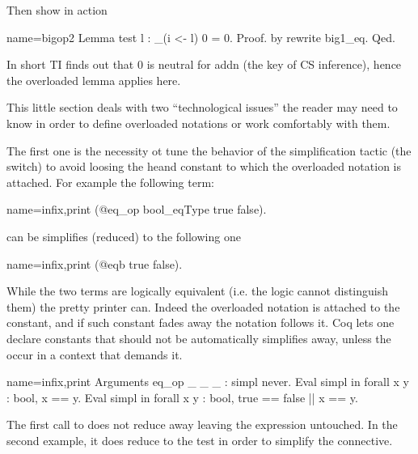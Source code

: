Then show in action

\begin{coq}{name=bigop2}{}
Lemma test l : \sum_(i <- l) 0 = 0.
Proof. by rewrite big1_eq. Qed.
\end{coq}

In short TI finds out that 0 is neutral for addn (the key of CS
inference), hence the overloaded lemma applies here.


This little section deals with two ``technological issues'' the reader
may need to know in order to define overloaded notations or work
comfortably with them.

The first one is the necessity ot tune the behavior of the
simplification tactic (the \C{/=} switch) to avoid loosing the
heand constant to which the overloaded notation is attached.
For example the following term:

\begin{coq}{name=infix,print}{}
  (@eq_op bool_eqType true false).
\end{coq}

can be simplifies (reduced) to the following one

\begin{coq}{name=infix,print}{}
  (@eqb true false).
\end{coq}

While the two terms are logically equivalent (i.e. the logic cannot
distinguish them) the pretty printer can.  Indeed the overloaded
\C{==} notation is attached to the  constant, and if such
constant fades away the notation follows it.  Coq lets one declare
constants that should not be automatically simplifies away, unless the
occur in a context that demands it.

\begin{coq}{name=infix,print}{}
Arguments eq_op {_} _ _ : simpl never.
Eval simpl in forall x y : bool, x == y.
Eval simpl in forall x y : bool, true == false || x == y.
\end{coq}

The first call to  does not reduce away 
leaving the expression untouched.  In the second example, it
does reduce to  the test  in order to
simplify the \C{||} connective.

